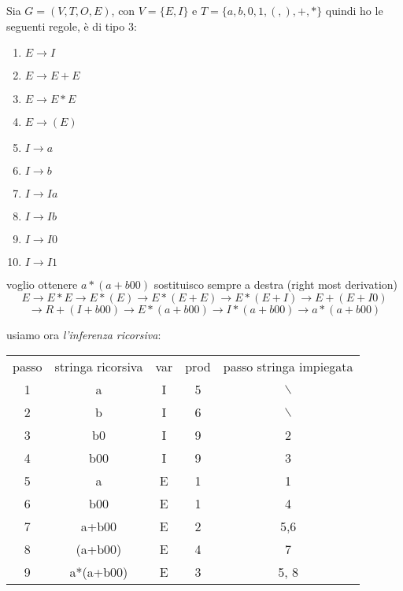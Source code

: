 \documentclass[a4paper,12pt, oneside]{book}
\begin{document}
\newpage
\begin{esempio}
	Sia $G=(V,T,O,E)$, con $V=\{E,I\}$ e $T=\{a,b,0,1,(,),+,*\}$
	quindi ho le seguenti regole, è di tipo 3:
	\begin{enumerate}
		\item $E\to I$
		\item $E\to E+E$
		\item $E\to E*E$
		\item $E\to (E)$
		\item $I\to a$
		\item $I\to b$
		\item $I\to Ia$
		\item $I\to Ib$
		\item $I\to I0$
		\item $I\to I1$
	\end{enumerate}
	voglio ottenere $a*(a+b00)$
	sostituisco sempre a destra (right most derivation)
	$$E\to E*E\to E*(E)\to E*(E+E)\to E*(E+I)\to E+(E+I0)$$
	$$\to R+(I+b00)\to E*(a+b00)\to I*(a+b00)\to a*(a+b00)$$

	usiamo ora \textit{l'inferenza ricorsiva}:
	\begin{center}
		\begin{tabular}{|c|c|c|c|c|}
			\hline
			passo & stringa ricorsiva & var & prod & passo stringa impiegata \\
			1     & a                 & I   & 5    & $\backslash$            \\
			\hline
			2     & b                 & I   & 6    & $\backslash$            \\
			\hline
			3     & b0                & I   & 9    & 2                       \\
			\hline
			4     & b00               & I   & 9    & 3                       \\
			\hline
			5     & a                 & E   & 1    & 1                       \\
			\hline
			6     & b00               & E   & 1    & 4                       \\
			\hline
			7     & a+b00             & E   & 2    & 5,6                     \\
			\hline
			8     & (a+b00)           & E   & 4    & 7                       \\
			\hline
			9     & a*(a+b00)         & E   & 3    & 5, 8                    \\
			\hline
		\end{tabular}
	\end{center}
\end{esempio}
\end{document}
